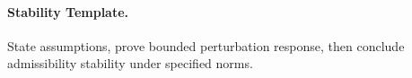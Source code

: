 \paragraph{Stability Template.} State assumptions, prove bounded perturbation response, then conclude admissibility stability under specified norms.\n